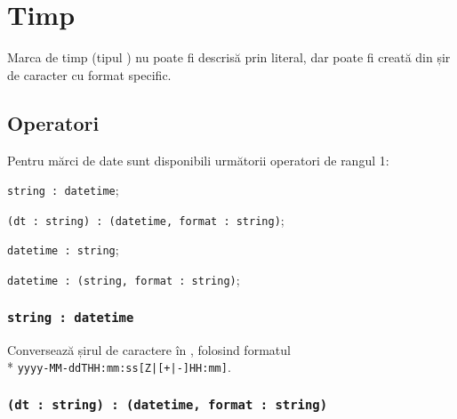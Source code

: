 \section{Timp}

Marca de timp (tipul ) nu poate fi descrisă prin literal, dar poate fi creată din șir de caracter cu format specific.

\subsection{Operatori}

Pentru mărci de date sunt disponibili următorii operatori de rangul 1:
\begin{icItems}
	\item \lstinline|string : datetime|;
	\item \lstinline|(dt : string) : (datetime, format : string)|;
	\item \lstinline|datetime : string|;
	\item \lstinline|datetime : (string, format : string)|;
\end{icItems}

\subsubsection{\lstinline|string : datetime|}

Conversează șirul de caractere în , folosind formatul \\* \lstinline`yyyy-MM-ddTHH:mm:ss[Z|[+|-]HH:mm]`.

\subsubsection{\lstinline|(dt : string) : (datetime, format : string)|}

